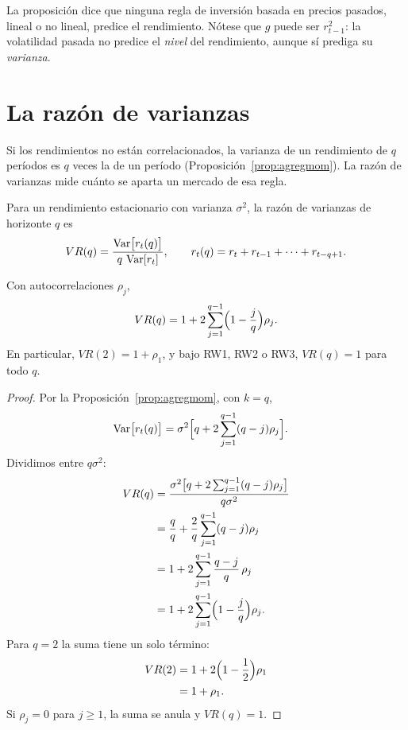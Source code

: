 La proposición dice que ninguna regla de inversión basada en precios pasados, lineal o no lineal, predice el
rendimiento. Nótese que $g$ puede ser $r_{t-1}^2$: la volatilidad pasada no predice el \emph{nivel} del
rendimiento, aunque sí prediga su \emph{varianza}.

\section{La razón de varianzas}

Si los rendimientos no están correlacionados, la varianza de un rendimiento de $q$ períodos es $q$ veces la de
un período (Proposición~\ref{prop:agregmom}). La razón de varianzas mide cuánto se aparta un mercado de esa
regla.

\begin{definicion}
Para un rendimiento estacionario con varianza $\sigma^2$, la razón de varianzas de horizonte $q$ es
\[
  VR(q)=\frac{\operatorname{Var}\bigl[r_t(q)\bigr]}{q\,\operatorname{Var}[r_t]},\qquad r_t(q)=r_t+r_{t-1}+\dots+r_{t-q+1}.
\]
\end{definicion}

\begin{proposicion}\label{prop:vrrho}
Con autocorrelaciones $\rho_j$,
\[
  VR(q)=1+2\sum_{j=1}^{q-1}\Bigl(1-\frac jq\Bigr)\rho_j .
\]
En particular, $VR(2)=1+\rho_1$, y bajo RW1, RW2 o RW3, $VR(q)=1$ para todo $q$.
\end{proposicion}

\begin{proof}
Por la Proposición~\ref{prop:agregmom}, con $k=q$,
\begin{align*}
  \operatorname{Var}\bigl[r_t(q)\bigr] &= \sigma^2\Bigl[q+2\sum_{j=1}^{q-1}(q-j)\rho_j\Bigr].
\end{align*}
Dividimos entre $q\sigma^2$:
\begin{align*}
  VR(q) &= \frac{\sigma^2\bigl[q+2\sum_{j=1}^{q-1}(q-j)\rho_j\bigr]}{q\sigma^2}\\
        &= \frac{q}{q}+\frac2q\sum_{j=1}^{q-1}(q-j)\rho_j\\
        &= 1+2\sum_{j=1}^{q-1}\frac{q-j}{q}\,\rho_j\\
        &= 1+2\sum_{j=1}^{q-1}\Bigl(1-\frac jq\Bigr)\rho_j .
\end{align*}
Para $q=2$ la suma tiene un solo término:
\begin{align*}
  VR(2) &= 1+2\Bigl(1-\frac12\Bigr)\rho_1\\
        &= 1+\rho_1 .
\end{align*}
Si $\rho_j=0$ para $j\ge1$, la suma se anula y $VR(q)=1$.
\end{proof}

